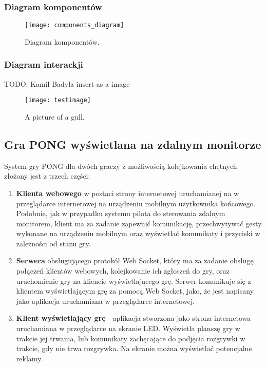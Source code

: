 \subsubsection{Diagram komponentów}

\begin{figure}[h!]
  \caption{Diagram komponentów.}
  \centering
    \texttt{[image: components\_diagram]}
\end{figure}


\subsubsection{Diagram interackji}

TODO: Kamil Badyla
insert as a image

\begin{figure}[h!]
  \caption{A picture of a gull.}
  \centering
    \texttt{[image: testimage]}
\end{figure}

\subsection{Gra PONG wyświetlana na zdalnym monitorze}

System gry PONG dla dwóch graczy z możliwością kolejkowania chętnych złożony jest z trzech części:

\begin{enumerate}
  \item \textbf{Klienta webowego} w postaci strony internetowej uruchamianej na w przeglądarce internetowej na urządzeniu mobilnym użytkownika końcowego. Podobnie, jak w przypadku systemu pilota do sterowania zdalnym monitorem, klient ma za zadanie zapewnić komunikację, przechwytywać gesty wykonane na urządzeniu mobilnym oraz wyświetlać komunikaty i przyciski w zależności od stanu gry.
  \item \textbf{Serwera} obsługującego protokół Web Socket, który ma za zadanie obsługę połączeń klientów webowych, kolejkowanie ich zgłoszeń do gry, oraz uruchomienie gry na kliencie wyświetlającego grę. Serwer komunikuje się z klientem wyświetlającym grę za pomocą Web Socket, jako, że jest napisany jako aplikacja uruchamiana w przeglądarce internetowej.
  \item \textbf{Klient wyświetlający grę} - aplikacja stworzona jako strona internetowa uruchamiana w przeglądarce na ekranie LED. Wyświetla planszę gry w trakcie jej trwania, lub komunikaty zachęcające do podjęcia rozgrywki w trakcie, gdy nie trwa rozgrywka. Na ekranie można wyświetlać potencjalne reklamy.
\end{enumerate}

